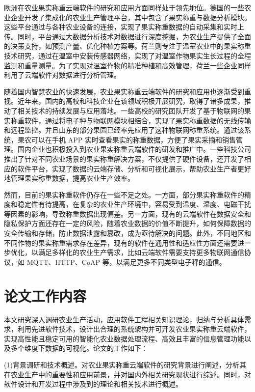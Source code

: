 欧洲在农业果实称重云端软件的研究和应用方面同样处于领先地位。德国的一些农业企业开发了集成化的农业生产管理平台，其中包含了果实称重与数据分析模块\cite{Yin2020}。这些平台通过与各种农业设备的连接，实现了果实称重数据的自动采集和实时上传。同时，平台通过大数据分析技术对数据进行深度挖掘，为农业生产提供了全面的决策支持，如预测产量、优化种植方案等\cite{Phate2021}。荷兰则专注于温室农业中的果实称重技术研究，通过在温室中安装传感器网络，实现了对温室作物果实生长过程的全程监测和重量测量\cite{Graaf2004}。为了实现对温室作物的精准种植和高效管理，荷兰一些企业同样利用了云端软件对数据进行分析管理。

随着国内智慧农业的快速发展，农业果实称重云端软件的研究和应用也逐渐受到重视。近年来，国内的高校和科技企业在该领域积极开展研究，取得了诸多成果，推动了相关技术的持续发展与应用落地。一些高校的研究团队开发了基于物联网的果实称重软件，通过将电子秤与物联网模块相结合，实现了果实称重数据的无线传输和远程监控\cite{Zhu2013}。并且山东的部分果园已经率先应用了这种物联网称重系统。通过该系统，果农可以在手机 APP 实时查看果实的称重数据，方便了果实采摘和销售管理\cite{Gao2023}。国内企业也积极投入到农业果实称重云端软件的研发和推广中。一些科技公司推出了针对不同农业场景的果实称重解决方案\cite{Ningbo2019}，不仅提供了硬件设备，还开发了相应的软件平台，实现了数据的云端存储、分析和可视化展示，帮助农业生产者更好地管理果实称重数据，提高农业生产效率。

然而，目前的果实称重软件仍存在一些不足之处。一方面，部分果实称重软件的精度和稳定性有待提高，在复杂的农业生产环境中，容易受到温度、湿度、电磁干扰等因素的影响，导致称重数据出现偏差\cite{汤建华2018}。另一方面，现有的云端软件在数据安全和隐私保护方面还存在一定的风险，随着农业数据的价值不断提升，如何保障数据的安全传输和存储，防止数据泄露和篡改，成为亟待解决的问题。此外，不同地区和不同作物的果实称重需求存在差异，现有的软件在通用性和适应性方面还需要进一步优化，以满足多样化的农业生产需求，比如云端软件需要支持更多物联网通信协议，如 MQTT、HTTP、CoAP 等，以满足更多不同类型电子秤的通信。

\section{论文工作内容}

本文研究深入调研农业生产活动，应用软件工程相关知识理论，归纳与分析具体需求，利用先进软件技术，设计出合理的系统架构并可开发农业果实称重云端软件，实现高性能且稳定可用的智能化农业数据处理流程、高效且丰富的信息管理功能以及多个维度下数据的可视化。论文的工作如下：

(1)背景调研和技术概述。对农业果实称重云端软件的研究背景进行阐述，分析其在农业生产中的重要性和应用前景，并对国内外相关研究现状进行综述。同时，对软件设计和开发过程中涉及到的理论和相关技术进行概述。

